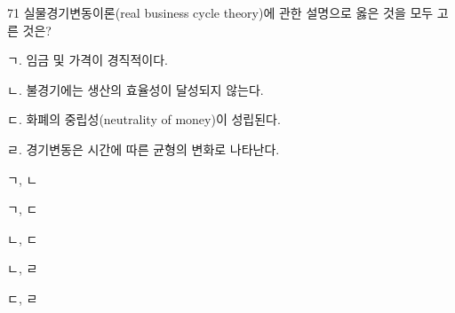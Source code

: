 \begin{question}{71}
실물경기변동이론(real business cycle theory)에 관한 설명으로 옳은 것을 모두 고른 것은?
\begin{framedtext}
ㄱ. 임금 및 가격이 경직적이다. \par
ㄴ. 불경기에는 생산의 효율성이 달성되지 않는다. \par
ㄷ. 화폐의 중립성(neutrality of money)이 성립된다. \par
ㄹ. 경기변동은 시간에 따른 균형의 변화로 나타난다. \par
\end{framedtext}
\begin{choices}
  \item ㄱ, ㄴ
  \item ㄱ, ㄷ
  \item ㄴ, ㄷ
  \item ㄴ, ㄹ
  \item ㄷ, ㄹ
\end{choices}
\end{question}
